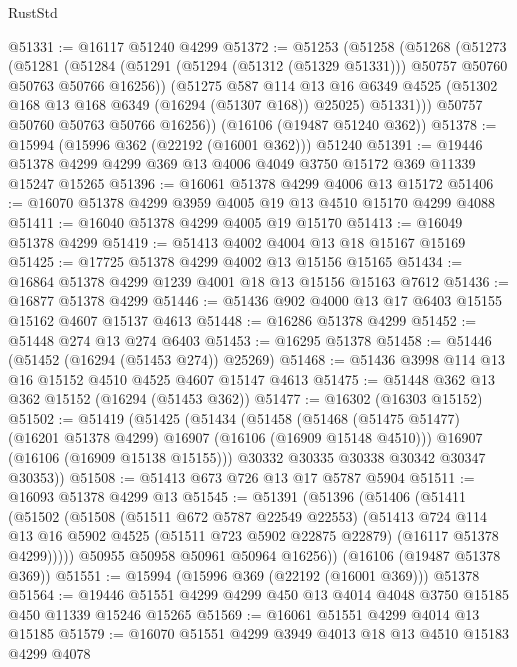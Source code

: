 \begin{lexlean}{RustStd}
\begin{coremodule}
@51331 := @16117 @51240 @4299
@51372 := @51253
    (@51258
      (@51268
        (@51273
          (@51281
            (@51284 (@51291 (@51294 (@51312 (@51329 @51331))) @50757 @50760 @50763 @50766 @16256))
            (@51275
              @587
              @114
              @13
              @16
              @6349
              @4525
              (@51302 @168 @13 @168 @6349 (@16294 (@51307 @168)) @25025)
              @51331)))
        @50757
        @50760
        @50763
        @50766
        @16256))
    (@16106 (@19487 @51240 @362))
@51378 := @15994 (@15996 @362 (@22192 (@16001 @362))) @51240
@51391 := @19446 @51378 @4299 @4299 @369 @13 @4006 @4049 @3750 @15172 @369 @11339 @15247 @15265
@51396 := @16061 @51378 @4299 @4006 @13 @15172
@51406 := @16070 @51378 @4299 @3959 @4005 @19 @13 @4510 @15170 @4299 @4088
@51411 := @16040 @51378 @4299 @4005 @19 @15170
@51413 := @16049 @51378 @4299
@51419 := @51413 @4002 @4004 @13 @18 @15167 @15169
@51425 := @17725 @51378 @4299 @4002 @13 @15156 @15165
@51434 := @16864 @51378 @4299 @1239 @4001 @18 @13 @15156 @15163 @7612
@51436 := @16877 @51378 @4299
@51446 := @51436 @902 @4000 @13 @17 @6403 @15155 @15162 @4607 @15137 @4613
@51448 := @16286 @51378 @4299
@51452 := @51448 @274 @13 @274 @6403
@51453 := @16295 @51378
@51458 := @51446 (@51452 (@16294 (@51453 @274)) @25269)
@51468 := @51436 @3998 @114 @13 @16 @15152 @4510 @4525 @4607 @15147 @4613
@51475 := @51448 @362 @13 @362 @15152 (@16294 (@51453 @362))
@51477 := @16302 (@16303 @15152)
@51502 := @51419
    (@51425
      (@51434
        (@51458
          (@51468 (@51475 @51477) (@16201 @51378 @4299) @16907 (@16106 (@16909 @15148 @4510)))
          @16907
          (@16106 (@16909 @15138 @15155)))
        @30332
        @30335
        @30338
        @30342
        @30347
        @30353))
@51508 := @51413 @673 @726 @13 @17 @5787 @5904
@51511 := @16093 @51378 @4299 @13
@51545 := @51391
    (@51396
      (@51406
        (@51411
          (@51502
            (@51508
              (@51511 @672 @5787 @22549 @22553)
              (@51413
                @724
                @114
                @13
                @16
                @5902
                @4525
                (@51511 @723 @5902 @22875 @22879)
                (@16117 @51378 @4299)))))
        @50955
        @50958
        @50961
        @50964
        @16256))
    (@16106 (@19487 @51378 @369))
@51551 := @15994 (@15996 @369 (@22192 (@16001 @369))) @51378
@51564 := @19446 @51551 @4299 @4299 @450 @13 @4014 @4048 @3750 @15185 @450 @11339 @15246 @15265
@51569 := @16061 @51551 @4299 @4014 @13 @15185
@51579 := @16070 @51551 @4299 @3949 @4013 @18 @13 @4510 @15183 @4299 @4078

\end{coremodule}
\end{lexlean}
